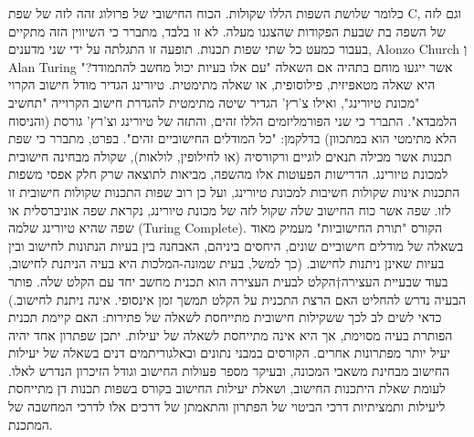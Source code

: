 \begin{טבלא}[!htbp]
      כלומר שלושת השפות הללו שקולות. הכוח החישובי של פרולוג זהה לזה של שפת C,
      וגם לזה של השפה בת שבעת הפקודות שהצגנו מעלה. לא זו בלבד, מתברר כי השיווין
      הזה מתקיים בעבור כמעט כל שתי שפות תכנות. תופעה זו התגלתה על ידי שני
      מדענים, Alonzo Church וְ Alan Turing אשר ייגעו מוחם בתהיה אם השאלה "עם אלו
      בעיות יכול מחשב להתמודד?" היא שאלה מטאפיזית, פילוסופית, או שאלה מתימטית.
      טיורינג הגדיר מודל חישוב הקרוי "מכונת טיורינג", ואילו צ'רץ' הגדיר שיטה מתימטית להגדרת חישוב הקרוייה "תחשיב הלמבדא". התברר כי שני הפורמליזמים הללו זהים, והתזה של טיורינג וצ'רץ' גורסת (והניסוח הלא מתימטי הוא במתכוון) בדלקמן: "כל המודלים החישוביים זהים".
      בפרט, מתברר כי שפת תכנות אשר מכילה תנאים לוגיים ורקורסיה (או לחילופין, לולאות), שקולה מבחינה חישובית למכונת טיורינג. הדרישות הפעוטות אלו מהשפה, מביאות לתוצאה שרק חלק אפסי משפות התכנות אינות שקולות חשיבות למכונת טיורינג, ועל כן רוב שפות התכנות שקולות חישובית זו לזו.
      שפה אשר כוח החישוב שלה שקול לזה של מכונת טיורינג, נקראת שפה אוניברסלית או שפה שהיא טיורינג שלמה (Turing Complete).
      הקורס "תורת החישוביות" מעמיק מאוד בשאלה של מודלים חישוביים שונים, היחסים ביניהם, האבחנה בין בעיות הנתונות לחישוב ובין בעיות שאינן ניתנות לחישוב. (כך למשל, בעית שמונה-המלכות היא בעיה הניתנת לחישוב, בעוד שבעיית העצירה†{הקלט לבעית העצירה הוא תכנית מחשב יחד עם הקלט שלה. פותר הבעיה נדרש להחליט האם הרצת התכנית על הקלט תמשך זמן אינסופי.} אינה ניתנת לחישוב.)
      כדאי לשים לב לכך ששקילות חישובית מתייחסת לשאלה של פתירות: האם קיימת תכנית הפותרת בעיה מסוימת, אך היא אינה מתייחסת לשאלה של יעילות. יתכן שפתרון אחד יהיה יעיל יותר מפתרונות אחרים.
      הקורסים במבני נתונים ובאלגוריתמים דנים בשאלה של יעילות החישוב מבחינת משאבי המכונה, ובעיקר מספר פעולות החישוב וגודל הזיכרון הנדרש לאלו. לעומת שאלת היתכנות החישוב, ושאלת יעילות החישוב בקורס בשפות תכנות דן מתייחסת ליעילות ותמציתיות דרכי הביטוי של הפתרון והתאמתן של דרכים אלו לדרכי המחשבה של המתכנת.


\end{טבלא}
